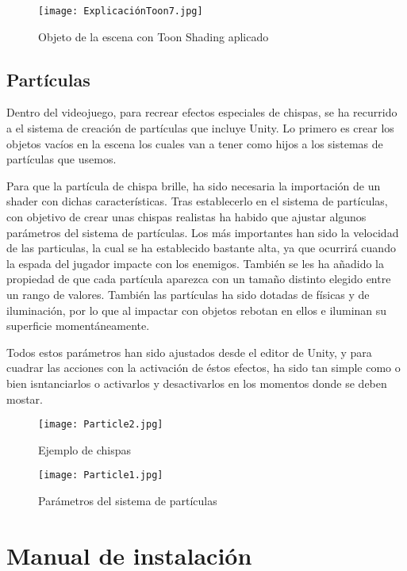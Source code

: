 \begin{figure}[H]
    \centering
    \texttt{[image: ExplicaciónToon7.jpg]}
    \caption{Objeto de la escena con Toon Shading aplicado}
\end{figure}

\subsection{Partículas}

Dentro del videojuego, para recrear efectos especiales de chispas, se ha recurrido a el sistema de creación de partículas que incluye Unity. Lo primero es crear los objetos vacíos en la escena los cuales van a tener como hijos a los sistemas de partículas que usemos.

Para que la partícula de chispa brille, ha sido necesaria la importación de un shader con dichas características. Tras establecerlo en el sistema de partículas, con objetivo de crear unas chispas realistas ha habido que ajustar algunos parámetros del sistema de partículas. Los más importantes han sido la velocidad de las particulas, la cual se ha establecido bastante alta, ya que ocurrirá cuando la espada del jugador impacte con los enemigos. También se les ha añadido la propiedad de que cada partícula aparezca con un tamaño distinto elegido entre un rango  de valores. También las partículas ha sido dotadas de físicas y de iluminación, por lo que al impactar con objetos rebotan en ellos e iluminan su superficie momentáneamente.

Todos estos parámetros han sido ajustados desde el editor de Unity, y para cuadrar las acciones con la activación de éstos efectos, ha sido tan simple como o bien isntanciarlos o activarlos y desactivarlos en los momentos donde se deben mostar.

\begin{figure}[H]
    \centering
    \texttt{[image: Particle2.jpg]}
    \caption{Ejemplo de chispas}
\end{figure}


\begin{figure}[H]
    \centering
    \texttt{[image: Particle1.jpg]}
    \caption{Parámetros del sistema de partículas}
\end{figure}

\section{Manual de instalación}

